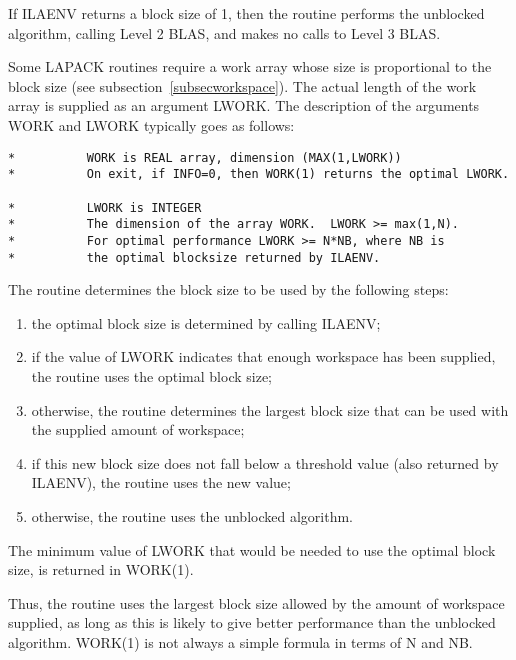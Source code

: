If ILAENV returns a block size
of 1, then the routine performs the unblocked algorithm, calling Level 2 BLAS,
and makes no calls to Level 3 BLAS.

Some LAPACK routines require a work array whose size is proportional to
the block size (see subsection~\ref{subsecworkspace}). The actual length
of the work array is supplied as an argument LWORK. The description of
the arguments WORK and LWORK typically goes as follows:

\begin{verbatim}
*          WORK is REAL array, dimension (MAX(1,LWORK))
*          On exit, if INFO=0, then WORK(1) returns the optimal LWORK.

*          LWORK is INTEGER
*          The dimension of the array WORK.  LWORK >= max(1,N).
*          For optimal performance LWORK >= N*NB, where NB is
*          the optimal blocksize returned by ILAENV.
\end{verbatim}

The routine determines the block size to be used by the following steps:

\begin{enumerate}

\item the optimal block size is determined by calling ILAENV;

\item if the value of LWORK indicates that enough workspace has been
supplied, the routine uses the optimal block size;

\item otherwise, the routine determines the largest block size that
can be used with the supplied amount of workspace;

\item if this new block size does not fall below a
threshold value (also returned by ILAENV), the routine uses the new
value;

\item otherwise, the routine uses the unblocked algorithm.
\end{enumerate}

The minimum value of LWORK that would be needed to use
the optimal block size, is returned in WORK(1).

Thus, the routine uses the largest block size allowed by the amount
of workspace supplied, as long as this is likely to
give better performance than the unblocked algorithm.
WORK(1) is not always a simple formula in terms of N and NB.

